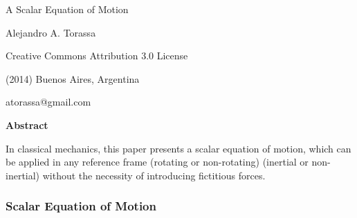 \documentclass[10pt]{article}
\begin{document}
\begin{center}

{\Large A Scalar Equation of Motion}

\bigskip \medskip

Alejandro A. Torassa

\bigskip \medskip

\footnotesize

Creative Commons Attribution 3.0 License

(2014) Buenos Aires, Argentina

atorassa@gmail.com

\bigskip \smallskip

\small

{\bf Abstract}

\bigskip

\parbox{74mm}{In classical mechanics, this paper presents a scalar equation of motion, which can be applied in any reference frame (rotating or non-rotating) (inertial or non-inertial) without the necessity of introducing fictitious forces.}

\end{center}

\normalsize

\vspace{-0.60em}

{\centering\subsubsection*{Scalar Equation of Motion}}

\vspace{+1.20em}
\end{document}
